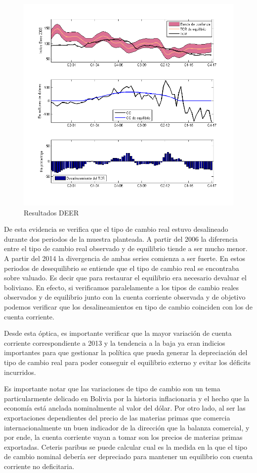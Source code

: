 \documentclass[12pt,letterpaper]{article}
\begin{document}
\begin{figure}
\caption{Resultados DEER}
\centering
\includegraphics[scale=0.7]{tcreq}
\end{figure}

De esta evidencia se verifica que el tipo de cambio real estuvo desalineado durante dos periodos de la muestra planteada. A partir del 2006 la diferencia entre el tipo de cambio real observado y de equilibrio tiende a ser mucho menor. A partir del 2014 la divergencia de ambas series comienza a ser fuerte. En estos periodos de desequilibrio se entiende que el tipo de cambio real se encontraba sobre valuado. Es decir que para restaurar el equilibrio era necesario devaluar el boliviano. En efecto, si verificamos paralelamente a los tipos de cambio reales observados y de equilibrio junto con la cuenta corriente observada y de objetivo podemos verificar que los desalineamientos en tipo de cambio coinciden con los de cuenta corriente. 

Desde esta óptica, es importante verificar que la mayor variación de cuenta corriente correspondiente a 2013 y la tendencia a la baja ya eran indicios importantes para que gestionar la política que pueda generar la depreciación del tipo de cambio real para poder conseguir el equilibrio externo y evitar los déficits incurridos.

Es importante notar que las variaciones de tipo de cambio son un tema particularmente delicado en Bolivia por la historia inflacionaria y el hecho que la economía está anclada nominalmente al valor del dólar. Por otro lado, al ser las exportaciones dependientes del precio de las materias primas que comercia internacionalmente un buen indicador de la dirección que la balanza comercial, y por ende, la cuenta corriente vayan a tomar son los precios de materias primas exportadas. Ceteris paribus se puede calcular cual es la medida en la que el tipo de cambio nominal debería ser depreciado para mantener un equilibrio con cuenta corriente no deficitaria.
\end{document}
